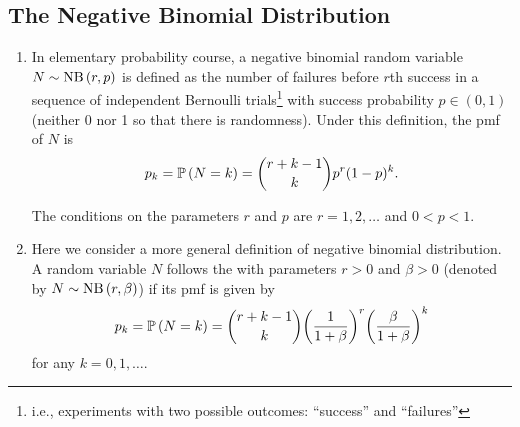 \subsection{The Negative Binomial Distribution}
\begin{enumerate}
\item \label{it:nb-dist-elementary-def}
In elementary probability course, a negative binomial random variable
\(N\sim\operatorname{NB}\left(r,p\right)\) is defined as the number of failures before \(r\)th success in a sequence
of independent Bernoulli trials\footnote{i.e., experiments with two possible outcomes:
``success'' and ``failures''} with success probability \(p\in(0,1)\) (neither 0
nor 1 so that there is randomness). Under this definition, the pmf of \(N\) is
\[
p_k=\mathbb{P}\left(N=k\right)=\binom{r+k-1}{k}p^r(1-p)^k.
\]
\begin{center}
\end{center}
The conditions on the parameters \(r\) and \(p\) are \(r=1,2,\dotsc\) and
\(0<p<1\).

\item Here we consider a more general definition of negative binomial
distribution. A random variable \(N\) follows the  with parameters \(r>0\) and \(\beta>0\) (denoted by
\(N\sim\operatorname{NB}\left(r,\beta\right)\)) if its pmf is given by
\begin{equation}
\label{eq:nb-def}
p_k=\mathbb{P}\left(N=k\right)=\binom{r+k-1}{k}\qty(\frac{1}{1+\beta})^{r}\qty(\frac{\beta}{1+\beta})^k
\end{equation}
for any \(k=0,1,\dotsc\).


\end{enumerate}
